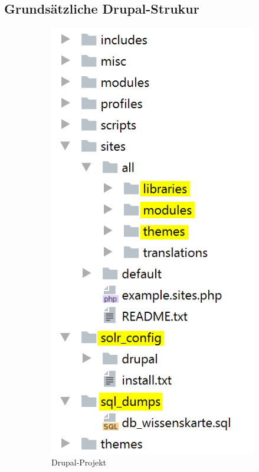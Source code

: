 \subsection{Grundsätzliche Drupal-Strukur}\label{sub:strukture_project}
\begin{figure}[!h]
	\centering
	\begin{subfigure}[b]{0.4\textwidth}
		\centering
		\includegraphics[height=0.25\textheight]{images/structure_project}
		\caption[]{Drupal-Projekt}
		\label{fig:structureproject}
	\end{subfigure}
	\begin{subfigure}[b]{0.4\textwidth}
		\centering

\end{subfigure}
\end{figure}
